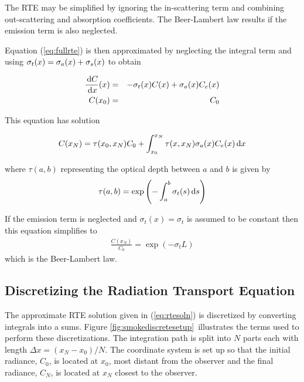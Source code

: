 The RTE may be simplified by ignoring the in-scattering term and combining out-scattering
and absorption coefficients.  The Beer-Lambert law results if the emission term is also
neglected.

Equation (\ref{eq:fullrte}) is then approximated by neglecting the
integral term and using $\sigma_t(x)=\sigma_a(x)+\sigma_s(x)$ to obtain

\begin{eqnarray}
\frac{\,\mbox{d}C}{\,\mbox{d}x}(x)&=&-\sigma_t(x) C(x) + \sigma_a(x) C_e(x)\\
 C(x_0)&=&C_0
\end{eqnarray}

\noindent This equation has solution

\begin{equation}
\label{eq:rtesoln}
 C(x_N)=\tau(x_0,x_N)C_0 + \int_{x_0}^{x_N}\tau(x,x_N)\sigma_a(x)C_e(x) \,\mbox{d}x
\end{equation}

\noindent where $\tau(a,b)$ representing the optical depth between $a$ and $b$ is given by
\begin{equation}
\label{eq:optdepth}
\tau(a,b)=\exp\left({-\int_{a}^{b} \sigma_t(s) \,\mbox{d}s}\right)
\end{equation}

\noindent If the emission term is neglected and $\sigma_t(x)=\sigma_t$ is assumed to be constant
then this equation simplifies to
\begin{eqnarray}
 \frac{C(x_N)}{C_0}=\exp(-\sigma_tL)
\end{eqnarray}
which is the Beer-Lambert law.


\subsection{Discretizing the Radiation Transport Equation}
\newcommand{\htau}[1]{\tau_{#1}^{N-1}}
\newcommand{\halpha}[1]{\alpha_{#1}^{N-1}}
\newcommand{\sigai}[1]{\sigma_{a,#1}}
\newcommand{\Lei}[1]{C_{e,#1}}
\newcommand{\Lhatj}[1]{C_{#1}^N}
\newcommand{\Lhatjj}[1]{\hat{C}_{#1}^N}
\newcommand{\Chatjj}[1]{\hat{C}_{#1}^N}
\newcommand{\Leii}[1]{\hat{C}_{e,#1}}

The approximate RTE solution given in (\ref{eq:rtesoln}) is
discretized by converting integrals into a sums. Figure
\ref{fig:smokediscretesetup}\ illustrates the terms used to
perform these discretizations.  The integration path is split into $N$ parts
each with length $\Delta x=(x_N-x_0)/N$.  The coordinate system is
set up so that the initial radiance, $C_0$, is located at $x_0$,
most distant from the observer and the final radiance, $C_N$, is
located at $x_N$ closest to the observer.

